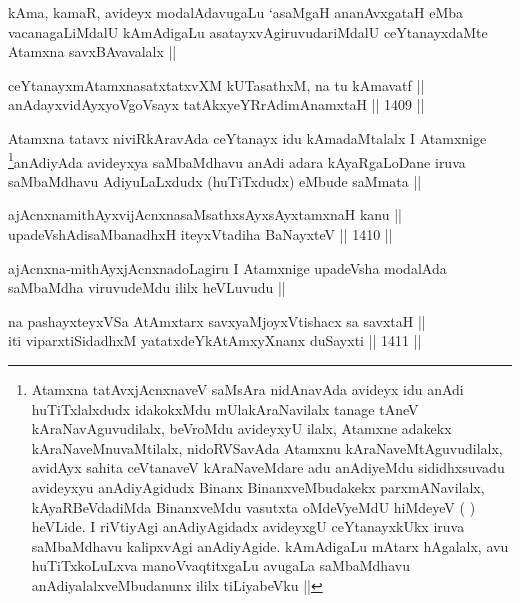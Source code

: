 \begin{artha}
kAma, kamaR, avideyx modalAdavugaLu `asaMgaH ananAvxgataH eMba vacanagaLiMdalU kAmAdigaLu asatayxvAgiruvudariMdalU ceYtanayxdaMte Atamxna savxBAvavalalx ||
\end{artha}

\begin{shl}
ceYtanayxmAtamxnasatxtatxvXM kUTasathxM, na tu kAmavatf || \\
anAdayxvidAyxyoVgoV\s sayx tatAkxyeYRrAdimAnamxtaH \hfill || 1409 ||  
\end{shl}

\begin{artha}
Atamxna tatavx niviRkAravAda ceYtanayx idu kAmadaMtalalx I Atamxnige \footnote{Atamxna tatAvxjAcnxnaveV saMsAra nidAnavAda avideyx idu anAdi huTiTxlalxdudx idakokxMdu mUlakAraNavilalx tanage tAneV kAraNavAguvudilalx, beVroMdu avideyxyU ilalx, Atamxne adakekx kAraNaveMnuvaMtilalx, nidoRVSavAda Atamxnu kAraNaveMtAguvudilalx, avidAyx sahita ceVtanaveV kAraNaveMdare adu anAdiyeMdu sididhxsuvadu avideyxyu anAdiyAgidudx Binanx BinanxveMbudakekx parxmANavilalx, kAyaRBeVdadiMda BinanxveMdu vasutxta oMdeVyeMdU hiMdeyeV ( ) heVLide. I riVtiyAgi anAdiyAgidadx avideyxgU ceYtanayxkUkx iruva saMbaMdhavu kalipxvAgi anAdiyAgide. kAmAdigaLu mAtarx hAgalalx, avu huTiTxkoLuLxva manoVvaqtitxgaLu avugaLa saMbaMdhavu anAdiyalalxveMbudanunx ililx tiLiyabeVku ||}anAdiyAda avideyxya saMbaMdhavu anAdi adara kAyaRgaLoDane iruva saMbaMdhavu AdiyuLaLxdudx (huTiTxdudx) eMbude saMmata ||
\end{artha}


\begin{shl}
ajAcnxnamithAyxvijAcnxnasaMsathxsAyxsAyx\s \s tamxnaH kanu || \\
upadeVshAdisaMbanadhxH iteyxVtadiha BaNayxteV \hfill || 1410 ||  
\end{shl}	

\begin{artha}
ajAcnxna-mithAyxjAcnxnadoLagiru I Atamxnige upadeVsha modalAda saMbaMdha viruvudeMdu ililx heVLuvudu ||
\end{artha}


\begin{shl}
na pashayxteyxVSa AtAmx\s tarx savxyaMjoyxVtishacx sa savxtaH || \\
iti viparxtiSidadhxM yatatxdeYkAtAmxyXnanx duSayxti \hfill || 1411 || 
\end{shl}

